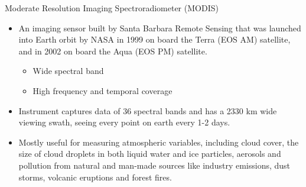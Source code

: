 \documentclass[10pt,dvipsnames,ignorenonframetext,aspectratio=169]{beamer}
\providecommand{\tightlist}{%
  \setlength{\itemsep}{0pt}\setlength{\parskip}{0pt}}
\begin{document}
\begin{frame}{Moderate Resolution Imaging Spectroradiometer (MODIS)}
\protect\hypertarget{moderate-resolution-imaging-spectroradiometer-modis}{}
\small

\begin{itemize}
\tightlist
\item
  An imaging sensor built by Santa Barbara Remote Sensing that was
  launched into Earth orbit by NASA in 1999 on board the Terra (EOS AM)
  satellite, and in 2002 on board the Aqua (EOS PM) satellite.

  \begin{itemize}
  \footnotesize
  \item Wide spectral band
  \item High frequency and temporal coverage
  \end{itemize}
\item
  Instrument captures data of 36 spectral bands and has a 2330 km wide
  viewing swath, seeing every point on earth every 1-2 days.
\item
  Mostly useful for measuring atmospheric variables, including cloud
  cover, the size of cloud droplets in both liquid water and ice
  particles, aerosols and pollution from natural and man-made sources
  like industry emissions, dust storms, volcanic eruptions and forest
  fires.
\end{itemize}
\end{frame}
\end{document}
